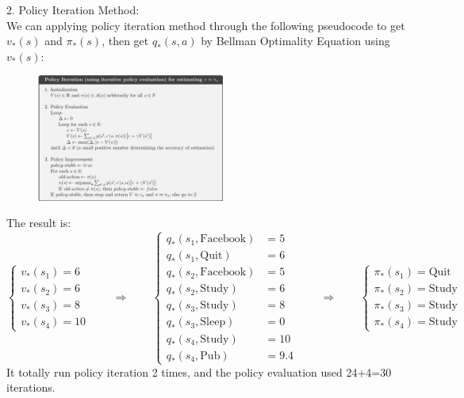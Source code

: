 \begin{homeworkProblem}
2. Policy Iteration Method: \\
We can applying policy iteration method through the following pseudocode to get $v_*(s)$ and $\pi_*(s)$, then get $q_*(s,a)$ by Bellman Optimality Equation using $v_*(s)$: \\
\begin{figure}[!htbp]
    \centering
    \vspace{-0.5cm}
    \includegraphics[width=0.55\textwidth]{./figure/policy_iteration_pseudocode}
    \vspace{-0.5cm}
\end{figure}
The result is:
$$\begin{cases}
v_*(s_1) = 6 \\
v_*(s_2) = 6 \\
v_*(s_3) = 8 \\
v_*(s_4) = 10
\end{cases} \qquad \Rightarrow \qquad \begin{cases}
q_*(s_1, \text{Facebook}) &= 5 \\
q_*(s_1, \text{Quit}) &= 6 \\
q_*(s_2, \text{Facebook}) &= 5 \\
q_*(s_2, \text{Study}) &= 6 \\
q_*(s_3, \text{Study}) &= 8 \\
q_*(s_3, \text{Sleep}) &= 0 \\
q_*(s_4, \text{Study}) &= 10 \\
q_*(s_4, \text{Pub}) &= 9.4
\end{cases} \qquad \Rightarrow \qquad \begin{cases}
\pi_*(s_1) = \text{Quit} \\
\pi_*(s_2) = \text{Study} \\
\pi_*(s_3) = \text{Study} \\
\pi_*(s_4) = \text{Study}
\end{cases}$$
It totally run policy iteration 2 times, and the policy evaluation used 24+4=30 iterations.


\end{homeworkProblem}

